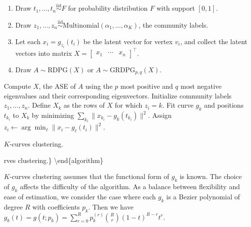 \documentclass[12pt]{article}
\providecommand{\tightlist}{%
  \setlength{\itemsep}{0pt}\setlength{\parskip}{0pt}}
\begin{document}
\begin{enumerate}
\def\labelenumi{\arabic{enumi}.}
\tightlist
\item
  Draw \(t_1, ..., t_n \stackrel{\mathrm{iid}}{\sim}F\) for probability
  distribution \(F\) with support \([0, 1]\).
\item
  Draw
  \(z_1, ..., z_n \stackrel{\mathrm{iid}}{\sim}\mathrm{Multinomial}(\alpha_1, ..., \alpha_K)\),
  the community labels.
\item
  Let each \(x_i = g_{z_i}(t_i)\) be the latent vector for vertex
  \(v_i\), and collect the latent vectors into matrix
  \(X = \begin{bmatrix} x_1 & \cdots & x_n \end{bmatrix}^\top\).
\item
  Draw \(A \sim \mathrm{RDPG}(X)\) or
  \(A \sim \mathrm{GRDPG}_{p,q}(X)\).
\end{enumerate}

\begin{algorithm}[h]
\DontPrintSemicolon
\SetAlgoLined
{}
Compute $X$, the ASE of $A$ using the $p$ most positive and $q$ most negative eigenvalues and their corresponding eigenvectors.\;
Initialize community labels $z_1, ..., z_n$.\;
 {
 {
Define $X_k$ as the rows of $X$ for which $z_i = k$.\;
Fit curve $g_k$ and positions $t_{k_i}$ to $X_k$ by minimizing $\sum_{k_i} \|x_{k_i} - g_k(t_{k_i})\|^2$.\;
}
 {
Assign $z_i \leftarrow \arg\min_\ell \|x_i - g_\ell(t_i)\|^2$.\
}
}
\caption{$K$-curves clustering.}
\end{algorithm}

rves clustering.\} \textbackslash end\{algorithm\}

\(K\)-curves clustering assumes that the functional form of \(g_k\) is
known. The choice of \(g_k\) affects the difficulty of the algorithm. As
a balance between flexibility and ease of estimation, we consider the
case where each \(g_k\) is a Bezier polynomial of degree \(R\) with
coefficients \(p_k\). Then we have
\(g_k(t) = g(t; p_k) = \sum_{r=0}^R p_k^{(r)} \binom{R}{r} (1-t)^{R-r} t^r\).
\end{document}
